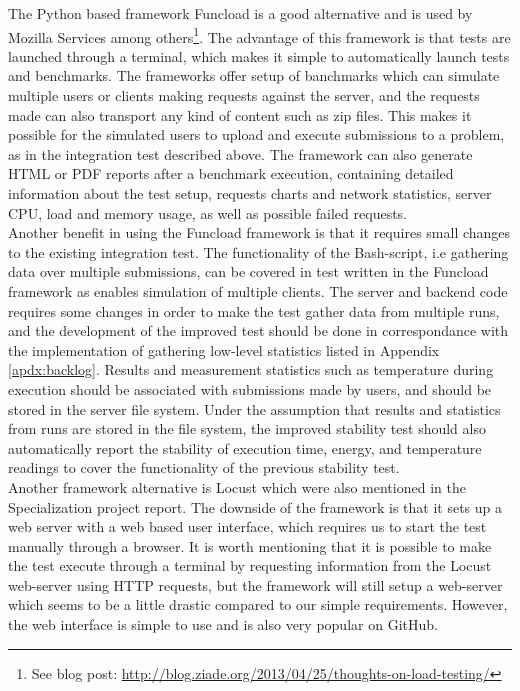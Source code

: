 The Python based framework Funcload \cite{FUNCLOAD} is a good alternative and is used by Mozilla Services among others\footnote{See blog post: \url{http://blog.ziade.org/2013/04/25/thoughts-on-load-testing/}}. The advantage of this framework is that tests are launched through a terminal, which makes it simple to automatically launch tests and benchmarks. The frameworks offer setup of banchmarks which can simulate multiple users or clients making requests against the server, and the requests made can also transport any kind of content such as zip files. This makes it possible for the simulated users to upload and execute submissions to a problem, as in the integration test described above. The framework can also generate HTML or PDF reports after a benchmark execution, containing detailed information about the test setup, requests charts and network statistics, server CPU, load and memory usage, as well as possible failed requests. \\

Another benefit in using the Funcload framework is that it requires small changes to the existing integration test. The functionality of the Bash-script, i.e gathering data over multiple submissions, can be covered in test written in the Funcload framework as enables simulation of multiple clients. The server and backend code requires some changes in order to make the test gather data from multiple runs, and the development of the improved test should be done in correspondance with the implementation of gathering low-level statistics listed in Appendix \ref{apdx:backlog}. Results and measurement statistics such as temperature during execution should be associated with submissions made by users, and should be stored in the server file system. Under the assumption that results and statistics from runs are stored in the file system, the improved stability test should also automatically report the stability of execution time, energy, and temperature readings to cover the functionality of the previous stability test. \\

Another framework alternative is Locust \cite{LOCUST} which were also mentioned in the Specialization project report. The downside of the framework is that it sets up a web server with a web based user interface, which requires us to start the test manually through a browser. It is worth mentioning that it is possible to make the test execute through a terminal by requesting information from the Locust web-server using HTTP requests, but the framework will still setup a web-server which seems to be a little drastic compared to our simple requirements. However, the web interface is simple to use and is also very popular on GitHub. \\

